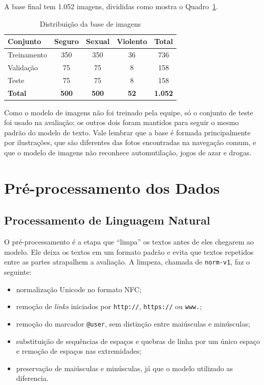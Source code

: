 \documentclass[
    12pt,           %
    oneside,        %
    a4paper,        %
    chapter=TITLE,  %
    english,        %
    brazil          %
]{abntex2}
\begin{document}
A base final tem 1.052 imagens, divididas como mostra o
Quadro~\ref{tab:base-imagens}.
\begin{table}[htbp]
\centering
\small
\renewcommand{\arraystretch}{1.3}
\begin{tabular}{|l|c|c|c|c|}
\hline
\textbf{Conjunto} & \textbf{Seguro} & \textbf{Sexual} & \textbf{Violento} & \textbf{Total} \\ \hline
Treinamento & 350 & 350 & 36 & 736 \\ \hline
Validação & 75 & 75 & 8 & 158 \\ \hline
Teste & 75 & 75 & 8 & 158 \\ \hline
\textbf{Total} & \textbf{500} & \textbf{500} & \textbf{52} & \textbf{1.052} \\ \hline
\end{tabular}
\caption{Distribuição da base de imagens}
\label{tab:base-imagens}
\end{table}

Como o modelo de imagens não foi treinado pela equipe, só o conjunto de teste
foi usado na avaliação; os outros dois foram mantidos para seguir o mesmo
padrão do modelo de texto. Vale lembrar que a base é formada principalmente
por ilustrações, que são diferentes das fotos encontradas na navegação comum,
e que o modelo de imagens não reconhece automutilação, jogos de azar e
drogas.
\section{Pré-processamento dos Dados}

\subsection{Processamento de Linguagem Natural}

O pré-processamento é a etapa que ``limpa'' os textos antes de eles chegarem
ao modelo. Ele deixa os textos em um formato padrão e evita que textos
repetidos entre as partes atrapalhem a avaliação. A limpeza, chamada de
\texttt{norm-v1}, faz o seguinte:
\begin{itemize}
    \item normalização Unicode no formato NFC;
    \item remoção de \textit{links} iniciados por \texttt{http://},
    \texttt{https://} ou \texttt{www.};
    \item remoção do marcador \texttt{@user}, sem distinção entre maiúsculas
    e minúsculas;
    \item substituição de sequências de espaços e quebras de linha por um
    único espaço e remoção de espaços nas extremidades;
    \item preservação de maiúsculas e minúsculas, já que o modelo utilizado as
    diferencia.
\end{itemize}
\end{document}
